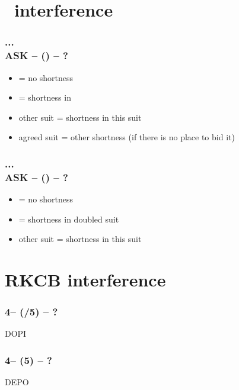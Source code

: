 \documentclass[12pt, a4paper]{report}
\begin{document}
{{        \section*{\colorbox{blue!30}{\hsf\ interference}}
         {

            \subsubsection*{...\\{\color{WildStrawberry}\textbf{ASK}\color{black}} -- (\anysuit{\textbullet}) -- ?}
            \begin{itemize}
                \item \dbl = no shortness
                \item \pass = shortness in \anysuit{\textbullet}
                \item other suit = shortness in this suit
                \item agreed suit = other shortness (if there is no place to bid it)
            \end{itemize}

            \subsubsection*{...\\{\color{WildStrawberry}\textbf{ASK}\color{black}} -- (\dbl) -- ?}
            \begin{itemize}
                \item \rdbl = no shortness
                \item \pass = shortness in doubled suit
                \item other suit = shortness in this suit
            \end{itemize}

        }

        \section*{\colorbox{blue!30}{RKCB interference}}
         {

            \subsubsection*{4\nt -- (\dbl/5\minor) -- ?}
            DOPI

            \subsubsection*{4\nt -- (5\major) -- ?}
            DEPO

        }

    }

}
\end{document}
